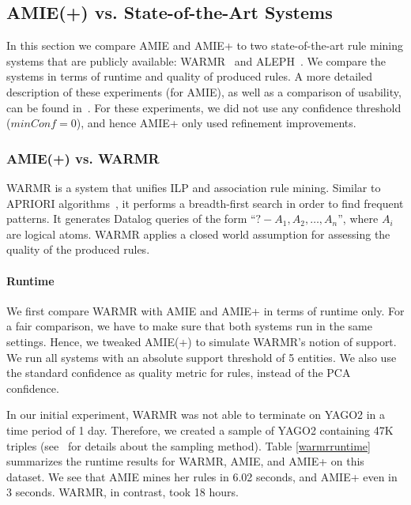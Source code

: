 




\subsection{AMIE(+) vs. State-of-the-Art Systems} \label{competitors}
In this section we compare AMIE and AMIE+ to two state-of-the-art rule mining systems
that are publicly available:
WARMR~\cite{GoeVan02} and ALEPH~\cite{Muggleton:1996:LPD:647996.742465}. We compare the systems in terms of runtime and quality of produced rules. A more detailed description of these experiments (for AMIE), as well as a comparison of usability, can be found in~\cite{amie}.
For these experiments, we did not use any confidence threshold ($minConf=0$), and hence AMIE+ only used refinement improvements.

\subsubsection{AMIE(+) vs. WARMR}
WARMR is a system that unifies ILP and association rule mining. Similar to APRIORI algorithms~\cite{Agrawal:1996:FDA:257938.257975}, it performs a
breadth-first search in order to find frequent patterns.
It generates Datalog queries of the form ``$?-A_1,A_2,\dots,A_n$'',
where $A_i$ are logical atoms. WARMR applies a closed world assumption for assessing the quality of the produced rules.

\paragraph{Runtime}
We first compare WARMR with AMIE and AMIE+ in terms of runtime only.
For a fair comparison, we have to make sure that both systems run in the same settings. Hence, we tweaked AMIE(+) to simulate WARMR's notion of support.
We run all systems with an absolute support threshold of 5 entities.
We also use the standard confidence as quality metric for rules, instead of the PCA confidence.

In our initial experiment, WARMR was not able to terminate on YAGO2 in a time period of 1 day.
Therefore, we created a sample of YAGO2 containing 47K triples (see~\cite{amie} for details about the sampling method).
Table \ref{warmrruntime} summarizes the runtime results for WARMR, AMIE, and AMIE+ on this dataset.
We see that AMIE mines her rules in 6.02 seconds, and AMIE+ even in 3 seconds. WARMR, in contrast, took 18 hours.

